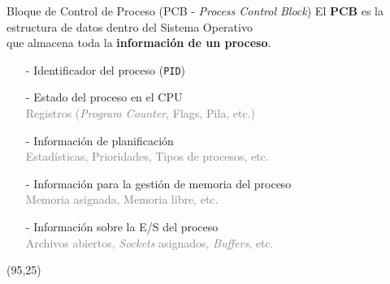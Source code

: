 \documentclass[aspectratio=169]{beamer}
\begin{document}
\begin{frame}{Bloque de Control de Proceso (PCB - \emph{Process Control Block})}
    \normalsize
    El \textbf{PCB} es la estructura de datos dentro del Sistema Operativo\\ que almacena toda la \textcolor{verdeuca}{\textbf{información de un proceso}}.
    \medskip
    \pause
    \small
    \begin{itemize}\setlength\itemsep{0.2cm}
    \item[-] Identificador del proceso (\texttt{PID})
    \item[-] Estado del proceso en el CPU\\
    \hspace{0.5cm}\textcolor{gray}{Registros (\emph{Program Counter}, Flags, Pila, etc.)}
    \item[-] Información de planificación\\
    \hspace{0.5cm}\textcolor{gray}{Estadísticas, Prioridades, Tipos de procesos, etc.}
    \item[-] Información para la gestión de memoria del proceso\\
    \hspace{0.5cm}\textcolor{gray}{Memoria asignada, Memoria libre, etc.}
    \item[-] Información sobre la E/S del proceso\\
    \hspace{0.5cm}\textcolor{gray}{Archivos abiertos, \emph{Sockets} asignados, \emph{Buffers}, etc.}
    \end{itemize}
    \begin{textblock}{60}(95,25)
    \end{textblock}
\end{frame}
\end{document}
